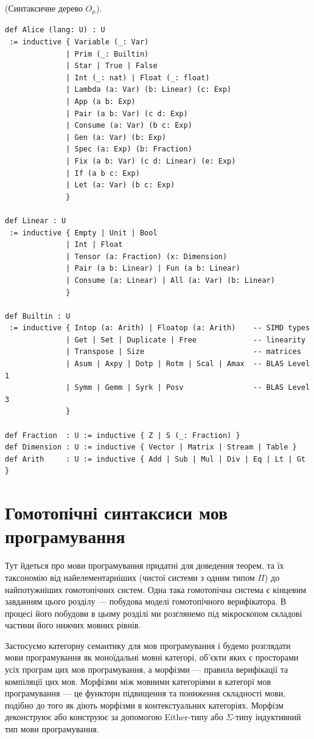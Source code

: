 \begin{definition} (Синтаксичне дерево $O_\mu$).
\begin{lstlisting}[mathescape=true]
def Alice (lang: U) : U
 := inductive { Variable (_: Var)
              | Prim (_: Builtin)
              | Star | True | False
              | Int (_: nat) | Float (_: float)
              | Lambda (a: Var) (b: Linear) (c: Exp)
              | App (a b: Exp)
              | Pair (a b: Var) (c d: Exp)
              | Consume (a: Var) (b c: Exp)
              | Gen (a: Var) (b: Exp)
              | Spec (a: Exp) (b: Fraction)
              | Fix (a b: Var) (c d: Linear) (e: Exp)
              | If (a b c: Exp)
              | Let (a: Var) (b c: Exp)
              }

def Linear : U
 := inductive { Empty | Unit | Bool
              | Int | Float
              | Tensor (a: Fraction) (x: Dimension)
              | Pair (a b: Linear) | Fun (a b: Linear)
              | Consume (a: Linear) | All (a: Var) (b: Linear)
              }

def Builtin : U
 := inductive { Intop (a: Arith) | Floatop (a: Arith)    -- SIMD types
              | Get | Set | Duplicate | Free             -- linearity
              | Transpose | Size                         -- matrices
              | Asum | Axpy | Dotp | Rotm | Scal | Amax  -- BLAS Level 1
              | Symm | Gemm | Syrk | Posv                -- BLAS Level 3
              }

def Fraction  : U := inductive { Z | S (_: Fraction) }
def Dimension : U := inductive { Vector | Matrix | Stream | Table }
def Arith     : U := inductive { Add | Sub | Mul | Div | Eq | Lt | Gt }

\end{lstlisting}
\end{definition}

\newpage
\section{Гомотопічні синтаксиси мов програмування}
Тут йдеться про мови програмування придатні для доведення теорем,
та їх таксономію від найелементарніших (чистої системи з одним типом $\Pi$) до
найпотужніших гомотопічних систем. Одна така гомотопічна система є кінцевим завданням
цього розділу --- побудова моделі гомотопічного верифікатора.
В процесі його побудови в цьому розділі ми розглянемо під
мікроскопом складові частини його нижчих мовних рівнів.

Застосуємо категорну семантику для мов програмування і будемо розглядати
мови програмування як моноїдальні мовні категорі, об'єкти яких є просторами
усіх програм цих мов програмування, а морфізми --- правила верифікації та компіляції цих мов.
Морфізми між мовними категоріями в категорї мов програмування --- це
функтори підвищення та пониження складності мови, подібно до того як діють
морфізми в контекстуальних категоріях. Морфізм деконструює або конструює за
допомогою Either-типу або $\Sigma$-типу індуктивний тип мови програмування.

